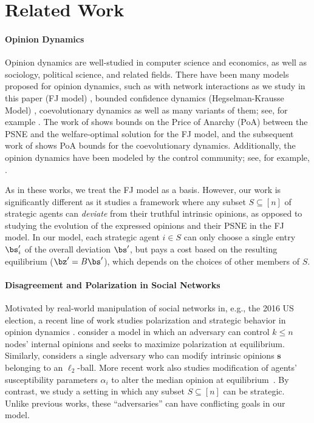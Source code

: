\section{Related Work}
\paragraph{Opinion Dynamics} Opinion dynamics are well-studied in computer science and economics, as well as sociology, political science, and related fields. There have been many models proposed for opinion dynamics, such as with network interactions as we study in this paper (FJ model) \citep{Friedkin1990,Bindel2015}, bounded confidence dynamics (Hegselman-Krausse Model) \citep{hegselmann2002opinion}, coevolutionary dynamics \citep{bhawalkar2013} as well as many variants of them; see, for example \citet{abebe2018opinion,hazla2019geometric,fotakis2016opinion,fotakis2023opinion,tsourakakis-2024}. The work of \citep{bindel2011} shows bounds on the Price of Anarchy (PoA) between the PSNE and the welfare-optimal solution for the FJ model, and the subsequent work of \cite{bhawalkar2013} shows PoA bounds for the coevolutionary dynamics. Additionally, the opinion dynamics have been modeled by the control community; see, for example, \citep{nedic2012,de2022,bhattacharyya2013convergence,chazelle2011total}. 

As in these works, we treat the FJ model as a basis. However, our work is significantly different as it studies a framework where any subset $S \subseteq [n]$ of strategic agents can {\em deviate} from their truthful intrinsic opinions, as opposed to studying the evolution of the expressed opinions and their PSNE in the FJ model. In our model, each strategic agent $i \in S$ can only choose a single entry $\bs_i^\prime$ of the overall deviation $\bs^\prime$, but pays a cost based on the resulting equilibrium ($\bz^\prime = B \bs^\prime$), which depends on the choices of other members of $S$. 

\paragraph{Disagreement and Polarization in Social Networks} Motivated by real-world manipulation of social networks in, e.g., the 2016 US election, a recent line of work studies polarization and strategic behavior in opinion dynamics \cite{gaitonde2020adversarial,gaitonde2021polarization,Chen2022,wang2024relationship,tsourakakis-2024,ristache2025countering}. 
\citet{Chen2022} consider a model in which an adversary can control $k \leq n$ nodes' internal opinions and seeks to maximize polarization at equilibrium. Similarly, \citet{gaitonde2020adversarial} considers a single adversary who can modify intrinsic opinions $\bm{s}$ belonging to an $\ell_2$-ball. More recent work also studies modification of agents' susceptibility parameters $\alpha_i$ to alter the median opinion at equilibrium~\cite{ristache2025countering}. By contrast, we study a setting in which any subset $S \subseteq [n]$ can be strategic. Unlike previous works, these ``adversaries'' can have conflicting goals in our model.

